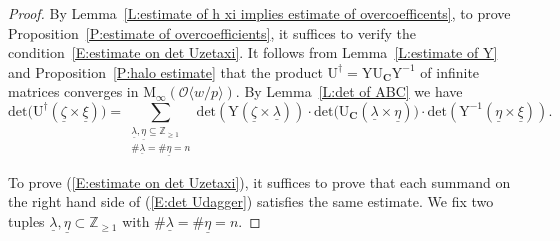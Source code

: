 \documentclass[12pt]{amsart}
\theoremstyle{definition}
\numberwithin{equation}{subsection}
\def\calO{\mathcal{O}}
\def\ZZ{\mathbb{Z}}
\def\bfC{\mathbf{C}}
\def\rmM{\mathrm{M}}
\def\rmU{\mathrm{U}}
\def\rmY{\mathrm{Y}}
\newcommand{\new}{\mathrm{new}}
\renewcommand{\det}{\mathrm{det}}
\begin{document}
\begin{proof}
By Lemma~\ref{L:estimate of h xi implies estimate of overcoefficents}, to prove Proposition~\ref{P:estimate of overcoefficients}, it suffices to verify the condition~\eqref{E:estimate on det Uzetaxi}.
It follows from Lemma~\ref{L:estimate of Y} and Proposition~\ref{P:halo estimate} that the product $\rmU^\dagger = \rmY\rmU_{\bfC} \rmY^{-1}$ of infinite matrices converges in $\rmM_\infty(\calO\langle w/p\rangle)$. By Lemma~\ref{L:det of ABC} we have
	\begin{equation}
	\label{E:det Udagger}
	\det \big( \rmU^{\dagger}(\underline \zeta \times \underline \xi)\big)  = \sum_{\substack{\underline \lambda, \underline \eta \subseteq \ZZ_{\geq 1}\\ \# \underline \lambda= \# \underline \eta = n}}  \det(\rmY(\underline \zeta\times \underline \lambda))  \cdot \det \big(\rmU_{\bfC}(\underline \lambda \times \underline \eta) \big) \cdot \det (\rmY^{-1}(\underline \eta\times \underline \xi)).
	\end{equation}
	
	
	
	
	To prove (\ref{E:estimate on det Uzetaxi}), it suffices to prove that each summand on the right hand side of (\ref{E:det Udagger}) satisfies the same estimate. We fix two tuples $\underline \lambda,\underline \eta\subset  \ZZ_{\geq 1}$ with $\# \underline \lambda=\#\underline \eta=n$.


\end{proof}
\end{document}
